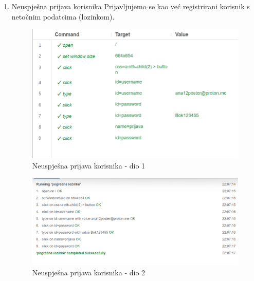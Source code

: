 			\begin{enumerate}
				\item Neuspješna prijava korisnika\newline
				Prijavljujemo se kao već registrirani korisnik s netočnim podatcima (lozinkom).
				\begin{figure}[H]
					\includegraphics[scale=0.40]{slike/deploy/fTest1a.png}
					\centering
					\caption{Neuspješna prijava korisnika - dio 1}
					\label{fig:fTest1a}
				\end{figure}
				\begin{figure}[H]
					\includegraphics[scale=0.40]{slike/deploy/fTest1b.png}
					\centering
					\caption{Neuspješna prijava korisnika - dio 2}
					\label{fig:fTest1b}
				\end{figure}
				

\end{enumerate}
